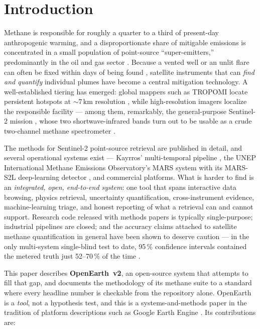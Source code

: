 \documentclass[11pt]{article}
\begin{document}
\section{Introduction}\label{sec:intro}

Methane is responsible for roughly a quarter to a third of present-day
anthropogenic warming, and a disproportionate share of mitigable emissions is
concentrated in a small population of point-source ``super-emitters,''
predominantly in the oil and gas sector \citep{jacob2022,lauvaux2022}.
Because a vented well or an unlit flare can often be fixed within days of
being found \citep{irakulis2022}, satellite instruments that can
\emph{find and quantify} individual plumes have become a central
mitigation technology. A well-established tiering has emerged: global
mappers such as TROPOMI locate persistent hotspots at
${\sim}7\,\mathrm{km}$ resolution \citep{veefkind2012,lorente2021,
schuit2023}, while high-resolution imagers localize the responsible
facility --- among them, remarkably, the general-purpose Sentinel-2
mission \citep{drusch2012}, whose two shortwave-infrared bands turn out to
be usable as a crude two-channel methane spectrometer
\citep{varon2021,gorrono2023,ehret2022}.

The methods for Sentinel-2 point-source retrieval are published in detail,
and several operational systems exist --- Kayrros' multi-temporal pipeline
\citep{ehret2022}, the UNEP International Methane Emissions Observatory's
MARS system with its MARS-S2L deep-learning detector
\citep{allen2025mars}, and commercial platforms. What is harder to find is
an \emph{integrated, open, end-to-end system}: one tool that spans
interactive data browsing, physics retrieval, uncertainty quantification,
cross-instrument evidence, machine-learning triage, and honest reporting
of what a retrieval can and cannot support. Research code released with
methods papers is typically single-purpose; industrial pipelines are
closed; and the accuracy claims attached to satellite methane
quantification in general have been shown to deserve caution --- in the
only multi-system single-blind test to date, 95\,\% confidence intervals
contained the metered truth just 52--70\,\% of the time
\citep{sherwin2024}.

This paper describes \textbf{OpenEarth~v2}, an open-source system that
attempts to fill that gap, and documents the methodology of its methane
suite to a standard where every headline number is checkable from the
repository alone. OpenEarth is a \emph{tool}, not a hypothesis test, and
this is a systems-and-methods paper in the tradition of platform
descriptions such as Google Earth Engine \citep{gorelick2017}. Its
contributions are:
\end{document}

